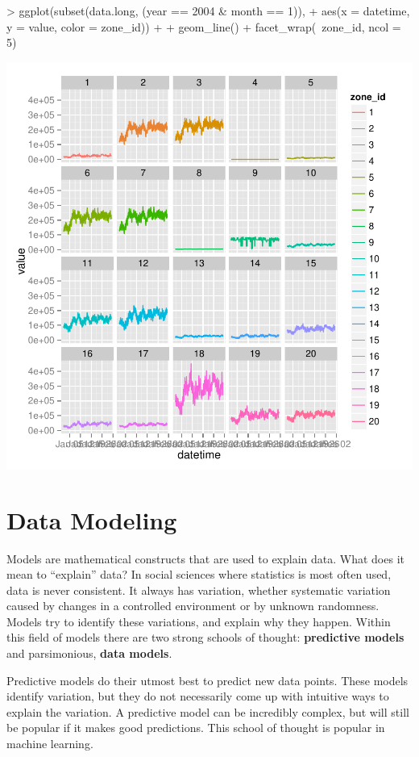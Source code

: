 \documentclass{article}
\begin{document}
\begin{Schunk}
\begin{Sinput}
> ggplot(subset(data.long, (year == 2004 & month == 1)),
+        aes(x = datetime, y = value, color = zone_id)) +
+ geom_line() + facet_wrap(~zone_id, ncol = 5)
\end{Sinput}
\end{Schunk}
\includegraphics{cookbook-042}

\section{Data Modeling}

Models are mathematical constructs that are used to explain data.  What
does it mean to ``explain'' data?  In social sciences where statistics is most
often used, data is never consistent.  It always has variation, whether
systematic variation caused by changes in a controlled environment or by unknown
randomness.  Models try to identify these variations, and explain why they happen.
Within this field of models there are two strong schools of thought: 
\textbf{predictive models} and parsimonious, \textbf{data models}.

Predictive models do their utmost best to predict new data points.  These models
identify variation, but they do not necessarily come up with intuitive
ways to explain the variation.  A predictive model can be incredibly complex,
but will still be popular if it makes good predictions.  This school of thought
is popular in machine learning.
\end{document}
